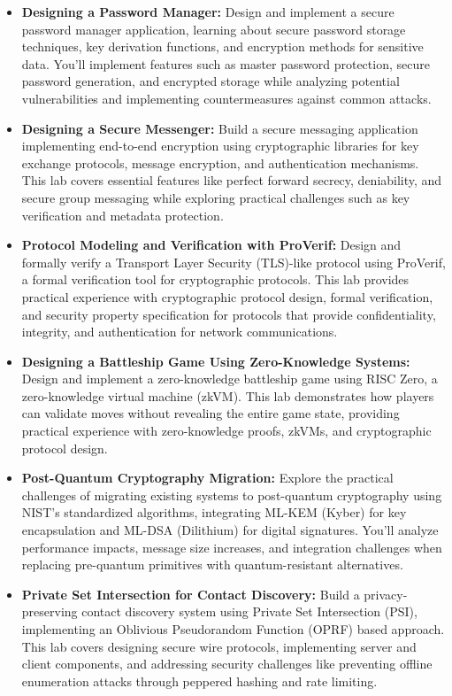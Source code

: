 \documentclass[10pt,a4paper,american]{exam}
\begin{document}
\begin{itemize}
	\item \textbf{Designing a Password Manager:} Design and implement a secure password manager application, learning about secure password storage techniques, key derivation functions, and encryption methods for sensitive data. You'll implement features such as master password protection, secure password generation, and encrypted storage while analyzing potential vulnerabilities and implementing countermeasures against common attacks.
	\item \textbf{Designing a Secure Messenger:} Build a secure messaging application implementing end-to-end encryption using cryptographic libraries for key exchange protocols, message encryption, and authentication mechanisms. This lab covers essential features like perfect forward secrecy, deniability, and secure group messaging while exploring practical challenges such as key verification and metadata protection.
	\item \textbf{Protocol Modeling and Verification with ProVerif:} Design and formally verify a Transport Layer Security (TLS)-like protocol using ProVerif, a formal verification tool for cryptographic protocols. This lab provides practical experience with cryptographic protocol design, formal verification, and security property specification for protocols that provide confidentiality, integrity, and authentication for network communications.
	\item \textbf{Designing a Battleship Game Using Zero-Knowledge Systems:} Design and implement a zero-knowledge battleship game using RISC Zero, a zero-knowledge virtual machine (zkVM). This lab demonstrates how players can validate moves without revealing the entire game state, providing practical experience with zero-knowledge proofs, zkVMs, and cryptographic protocol design.
	\item \textbf{Post-Quantum Cryptography Migration:} Explore the practical challenges of migrating existing systems to post-quantum cryptography using NIST's standardized algorithms, integrating ML-KEM (Kyber) for key encapsulation and ML-DSA (Dilithium) for digital signatures. You'll analyze performance impacts, message size increases, and integration challenges when replacing pre-quantum primitives with quantum-resistant alternatives.
	\item \textbf{Private Set Intersection for Contact Discovery:} Build a privacy-preserving contact discovery system using Private Set Intersection (PSI), implementing an Oblivious Pseudorandom Function (OPRF) based approach. This lab covers designing secure wire protocols, implementing server and client components, and addressing security challenges like preventing offline enumeration attacks through peppered hashing and rate limiting.

\end{itemize}
\end{document}
